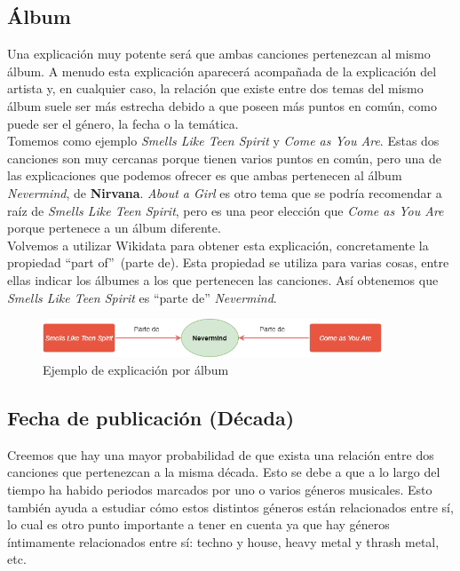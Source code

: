 \subsection*{Álbum}

Una explicación muy potente será que ambas canciones pertenezcan al mismo álbum. A menudo esta explicación aparecerá acompañada de la explicación del artista y, en cualquier caso, la relación que existe entre dos temas del mismo álbum suele ser más estrecha debido a que poseen más puntos en común, como puede ser el género, la fecha o la temática.\\

Tomemos como ejemplo \textit{Smells Like Teen Spirit} y \textit{Come as You Are}. Estas dos canciones son muy cercanas porque tienen varios puntos en común, pero una de las explicaciones que podemos ofrecer es que ambas pertenecen al álbum \textit{Nevermind}, de \textbf{Nirvana}. \textit{About a Girl} es otro tema que se podría recomendar a raíz de \textit{Smells Like Teen Spirit}, pero es una peor elección que \textit{Come as You Are} porque pertenece a un álbum diferente.\\

Volvemos a utilizar Wikidata para obtener esta explicación, concretamente la propiedad ``part of''~(parte de). Esta propiedad se utiliza para varias cosas, entre ellas indicar los álbumes a los que pertenecen las canciones. Así obtenemos que \textit{Smells Like Teen Spirit} es ``parte de'' \textit{Nevermind}.\\

\begin{figure}[h!]
	\centering
	\includegraphics[width = 0.9\textwidth]{Imagenes/Bitmap/Álbum ejemplo.png}
	\caption{Ejemplo de explicación por álbum}
	\label{fig:sampleImage}
\end{figure}

\subsection*{Fecha de publicación (Década)}

Creemos que hay una mayor probabilidad de que exista una relación entre dos canciones que pertenezcan a la misma década. Esto se debe a que a lo largo del tiempo ha habido periodos marcados por uno o varios géneros musicales. Esto también ayuda a estudiar cómo estos distintos géneros están relacionados entre sí, lo cual es otro punto importante a tener en cuenta ya que hay géneros íntimamente relacionados entre sí: techno y house, heavy metal y thrash metal, etc.\\

